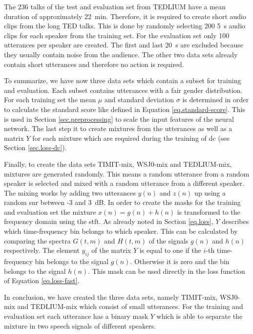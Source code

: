 The 236 talks of the test and evaluation set from TEDLIUM have a mean duration of approximately \SI{22}{min}.
Therefore, it is required to create short audio clips from the long TED talks. This is done by randomly selecting 200 \SI{5}{s} audio clips for each speaker from the training set. For the evaluation set only 100 utterances per speaker are created. The first and last \SI{20}{s} are excluded because they usually contain noise from the audience.
The other two data sets already contain short utterances and therefore no action is required.

To summarize, we have now three data sets which contain a subset for training and evaluation. Each subset contains utterances with a fair gender distribution. 
For each training set the mean $\mu$ and standard deviation $\sigma$ is determined in order to calculate the standard score like defined in Equation \ref{eq.standard-score}.
This is used in Section \ref{sec.preprocessing} to scale the input features of the neural network.
The last step it to create mixtures from the utterances as well as a matrix $Y$ for each mixture which are required during the training of \gls{dc} (see Section \ref{sec.loss-dc}).

Finally, to create the data sets TIMIT-mix, WSJ0-mix and TEDLIUM-mix, mixtures are generated randomly. This means a random utterance from a random speaker is selected and mixed with a random utterance from a different speaker. The mixing works by adding two utterances $y(n)$ and $z(n)$ up using a random \gls{snr} between -3 and \SI{3}{\dB}.
In order to create the masks for the training and evaluation set the mixture $x(n)=g(n)+h(n)$ is transformed to the frequency domain using the \gls{stft}.
As already noted in Section \ref{eq.loss}, $Y$ describes which time-frequency bin belongs to which speaker. This can be calculated by comparing the spectra $G(t, m)$ and $H(t, m)$ of the signals $g(n)$ and $h(n)$ respectively. The element $y_{ij}$ of the matrix $Y$ is equal to one if the $i$-th time-frequency bin belongs to the signal $g(n)$. Otherwise it is zero and the bin belongs to the signal $h(n)$.
This mask can be used directly in the loss function of Equation \ref{eq.loss-fast}.

In conclusion, we have created the three data sets, namely TIMIT-mix, WSJ0-mix and TEDLIUM-mix which consist of small utterances. For the training and evaluation set each utterance has a binary mask $Y$ which is able to separate the mixture in two speech signals of different speakers.

